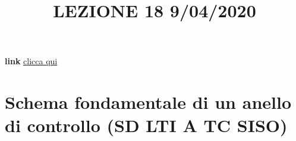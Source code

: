 \title{LEZIONE 18 9/04/2020}\newline
\textbf{link} \href{https://web.microsoftstream.com/video/a6351498-1edd-4ec9-b134-3b5fd7a9a3ee?list=user&userId=faa91214-a6f5-40d7-8875-253fd49b8ce1}{clicca qui}
\section{Schema fondamentale di un anello di controllo (SD LTI A TC SISO)}
